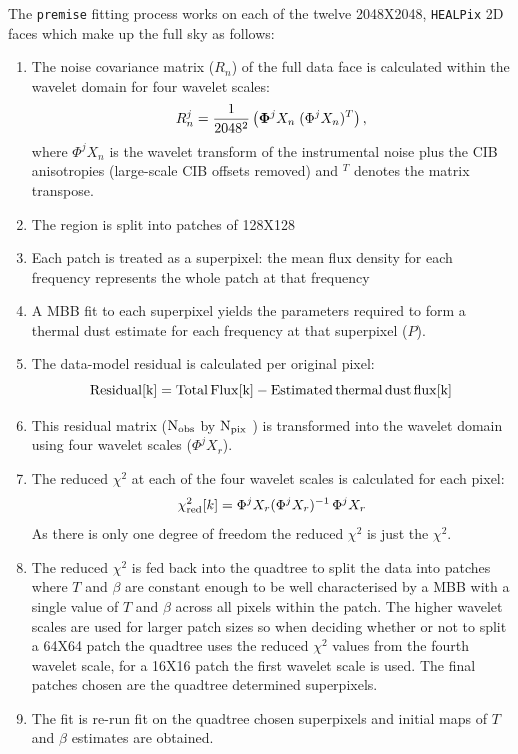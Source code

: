 \documentclass[a4paper,fleqn,usenatbib]{mnras}
\begin{document}
The {\texttt{premise}} fitting process works on each of the twelve 2048X2048, {\texttt{HEALPix}} 2D faces which make up the full sky as follows:
\begin{enumerate}[label*=\arabic*.]
\item The noise covariance matrix ($R_{n}$) of the full data face is calculated within the wavelet domain for four wavelet scales:
\begin{eqnarray}
R_{n}^{j} = \frac{1}{2048^2} \left( {\bf{ \Phi}}^{j} X_{n} \;  (\Phi^{j} X_{n})^{T} \right),
\end{eqnarray} 
where $\Phi^{j} X_{n}$ is the wavelet transform of the instrumental noise plus the CIB anisotropies (large-scale CIB offsets removed) and $^{T}$ denotes the matrix transpose.  
\item The region is split into patches of 128X128
\item Each patch is treated as a superpixel: the mean flux density for each frequency represents the whole patch at that frequency	
\item A MBB fit to each superpixel yields the parameters required to form a thermal dust estimate for each frequency at that superpixel ($P$).
\item The data-model residual is calculated per original pixel:
$$
\rm{Residual}[k] = \rm{Total \, Flux}[k] -  \rm{Estimated \, thermal \, dust \, flux}[k] 
$$
\item This residual matrix (${\rm{N_{obs}}}$ by ${\rm{N_{pix}}}$ ) is transformed into the wavelet domain using four wavelet scales ($\Phi^{j} X_{r}$). 
\item The reduced $\chi^{2}$ at each of the four wavelet scales is calculated for each pixel:
\begin{eqnarray}
\chi^{2}_{\rm{red}}[k] = \Phi^{j} X_{r}  (\Phi^{j} X_{r})^{-1} \, \Phi^{j} X_{r} 
\end{eqnarray}
As there is only one degree of freedom the reduced $\chi^{2}$ is just the $\chi^{2}$.
\item The reduced $\chi^{2}$ is fed back into the quadtree to split the data into patches where $T$ and $\beta$ are constant enough to be well characterised by a MBB with a single value of $T$ and $\beta$ across all pixels within the patch. The higher wavelet scales are used for larger patch sizes so when deciding whether or not to split a 64X64 patch the quadtree uses the reduced $\chi^{2}$ values from the fourth wavelet scale, for a 16X16 patch the first wavelet scale is used. The final patches chosen are the quadtree determined superpixels.  
\item The fit is re-run fit on the quadtree chosen superpixels and initial maps of $T$ and $\beta$ estimates are obtained.
\end{enumerate}
\end{document}
